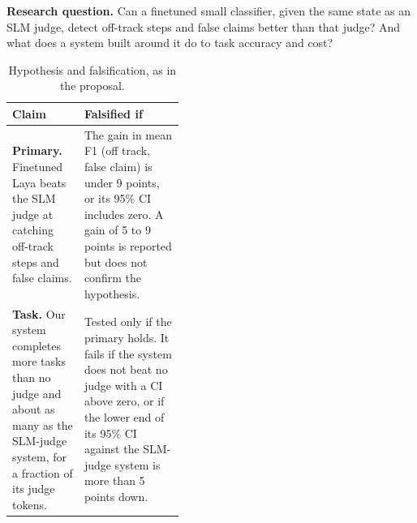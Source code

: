 \documentclass[10.5pt,a4paper]{article}
\newcommand{\tablestyle}{\small\rowcolors{2}{rowshade}{white}}
\begin{document}
\textbf{Research question.} Can a finetuned small classifier, given the same state as an SLM judge, detect off-track steps and false claims better than that judge? And what does a system built around it do to task accuracy and cost?

\begin{table}[H]
\centering\tablestyle
\caption{Hypothesis and falsification, as in the proposal.}\label{tab:hyp}
\begin{tabularx}{\linewidth}{P{0.42\linewidth}Y}
\toprule
{}\textbf{Claim} & \textbf{Falsified if} \\
\midrule
\textbf{Primary.} Finetuned Laya beats the SLM judge at catching off-track steps and false claims. & The gain in mean F1 (off track, false claim) is under 9 points, or its 95\% CI includes zero. A gain of 5 to 9 points is reported but does not confirm the hypothesis. \\
\textbf{Task.} Our system completes more tasks than no judge and about as many as the SLM-judge system, for a fraction of its judge tokens. & Tested only if the primary holds. It fails if the system does not beat no judge with a CI above zero, or if the lower end of its 95\% CI against the SLM-judge system is more than 5 points down. \\
\bottomrule
\end{tabularx}
\end{table}
\end{document}
